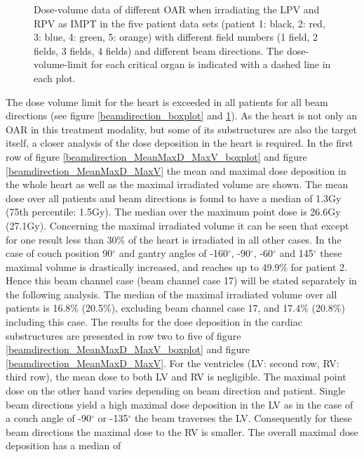 \begin{figure}[H]
{ }
\caption{Dose-volume data of different OAR when irradiating the LPV and RPV as IMPT in the five patient data sets (patient 1: black, 2: 
red, 3: blue, 4: green, 5: orange) with different field numbers (1 field, 2 fields, 3 fields, 4 fields) and different beam directions. 
The dose-volume-limit for each critical organ is indicated with a dashed line in each plot.}
\label{beamdirection}
\end{figure}

\newpage

The dose volume limit for the heart is exceeded in all patients for all beam directions (see figure \ref{beamdirection_boxplot} and \ref{beamdirection}). 
As the heart is not only an OAR in this treatment modality, but some of its substructures are also the target itself, a closer analysis of 
the dose deposition in the heart is required. In the first row of figure \ref{beamdirection_MeanMaxD_MaxV_boxplot} and figure \ref{beamdirection_MeanMaxD_MaxV} 
the mean and maximal dose deposition in the whole heart as well as the maximal irradiated volume are shown. The mean dose over all 
patients and beam directions is found to have a median of 1.3Gy (75th percentile: 1.5Gy). The median over the maximum point dose is 26.6Gy (27.1Gy).
Concerning the maximal irradiated volume it can be seen that except for one result less than 30\% of the heart is irradiated in all other cases. 
In the case of couch position 90$^{\circ}$ and gantry angles of -160$^{\circ}$, -90$^{\circ}$, -60$^{\circ}$ and 145$^{\circ}$ these maximal 
volume is drastically increased, and reaches up to 49.9\% for patient 2. Hence this beam channel case (beam channel case 17) will be 
stated separately in the following analysis. The median of the maximal irradiated volume over all patients is 16.8\% (20.5\%), 
excluding beam channel case 17, and 17.4\% (20.8\%) including this case.\newline
\newline
The results for the dose deposition in the cardiac substructures are presented in row two to five of figure \ref{beamdirection_MeanMaxD_MaxV_boxplot} and 
figure \ref{beamdirection_MeanMaxD_MaxV}. For the ventricles (LV: second row, RV: third row), the mean dose to both LV and RV is negligible. 
The maximal point dose on the other hand varies depending on beam direction and patient. Single beam directions yield a high maximal dose 
deposition in the LV as in the case of a couch angle of -90$^{\circ}$ or -135$^{\circ}$ the beam traverses the LV. 
Consequently for these beam directions the maximal dose to the RV is smaller. The overall maximal dose deposition has a median of 
